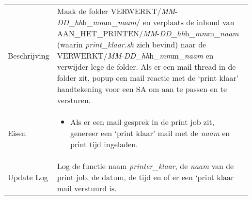 \documentclass{article}
\begin{document}
\begin{table}[H]
    \centering
    \begin{tabular}%
    {>{\raggedright\arraybackslash}p{}%
    |>{\raggedright\arraybackslash}p{}}
    \rowcolor{myblue} \multicolumn{2}{c}{\rule{0pt}{13pt}Functie: {\Large printer\_klaar.sh}} \\\hline
    Beschrijving & Maak de folder VERWERKT/\textit{MM}-\textit{DD}\_\textit{hh}h\_\textit{mm}m\_\textit{naam}/ en verplaats de inhoud van AAN\_HET\_PRINTEN/\textit{MM}-\textit{DD}\_\textit{hh}h\_\textit{mm}m\_\textit{naam} (waarin \textit{print\_klaar.sh} zich bevind) naar de VERWERKT/\textit{MM}-\textit{DD}\_\textit{hh}h\_\textit{mm}m\_\textit{naam} en verwijder lege de folder. Als er een mail thread in de folder zit, popup een mail reactie met de `print klaar' handtekening voor een SA om aan te passen en te versturen.\\

    Eisen & 
    \begin{itemize} 
\item Als er een mail gesprek in de print job zit, genereer een `print klaar' mail met de \textit{naam} en print tijd ingeladen.
\end{itemize} \\
  Update Log& Log de functie naam \textit{printer\_klaar}, de \textit{naam} van de print job, de datum, de tijd en of er een `print klaar
   mail verstuurd is.\\
    \end{tabular}
\end{table}
\end{document}
